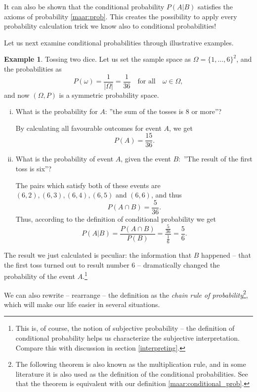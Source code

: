 \documentclass[12pt,a4paper,leqno]{report}
\theoremstyle{plain}
\theoremstyle{definition}
\newtheorem{esim}[equation]{Example}
\begin{document}
It can also be shown that the conditional probability $P(A|B)$ satisfies the axioms of probability \ref{maar:prob}. This creates the possibility to apply every probability calculation trick we know also to conditional probabilities!

\bigskip

Let us next examine conditional probabilities through illustrative examples.

\begin{esim}
Tossing two dice. Let us set the sample space as  $\Omega = \{1, \dots , 6\}^2$, and the probabilities as 
\[
P(\omega) = \frac{1}{|\Omega|} = \frac{1}{36} \quad \text{for all} \quad \omega \in \Omega, 
\]
and now $(\Omega,P)$ is a symmetric probability space.
\begin{enumerate}[(i)]
\item What is the probability for $A$: ''the sum of the tosses is $8$ or more''? 

By calculating all favourable outcomes for event $A$, we get
\[
P(A) = \frac{15}{36}.
\]

\item What is the probability of event $A$, given the event $B:$ ''The result of the first toss is six''?

The pairs which satisfy both of these events are  $(6,2), (6,3), (6,4), (6,5)$ and $(6,6)$, and thus 
\[
P(A \cap B) = \frac{5}{36}.
\] 
Thus, according to the definition of conditional probability we get 
\[
P(A|B) = \frac{P(A \cap B)}{P(B)} = \frac{\frac{5}{36}}{\frac{1}{6}} = \frac{5}{6}.
\]
\end{enumerate}
The result we just calculated is peculiar: the information that $B$ happened -- that the first toss turned out to result number $6$ -- dramatically changed the probability of the event $A$.\footnote{This is, of course, the notion of subjective probability -- the definition of conditional probability helps us characterize the subjective interpretation. Compare this with discussion in section \ref{interpreting}.}
\end{esim}

\bigskip

We can also rewrite -- rearrange -- the definition as the \emph{chain rule of probability}\footnote{The following theorem is also known as the multiplication rule, and in some literature it is also used as the definition of the conditional probabilities. See that the theorem is equivalent with our definition \ref{maar:conditional_prob}.}, which will make our life easier in several situations.
\end{document}
